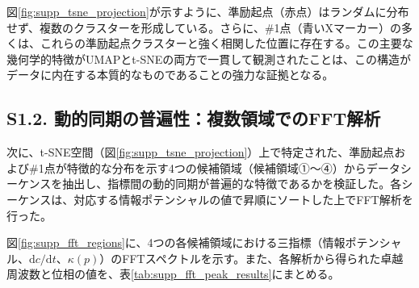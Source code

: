 \documentclass[a4paper,12pt]{article}
\begin{document}
図\ref{fig:supp_tsne_projection}が示すように、準励起点（赤点）はランダムに分布せず、複数のクラスターを形成している。さらに、\#1点（青いXマーカー）の多くは、これらの準励起点クラスターと強く相関した位置に存在する。この主要な幾何学的特徴がUMAPとt-SNEの両方で一貫して観測されたことは、この構造がデータに内在する本質的なものであることの強力な証拠となる。

\subsection*{S1.2. 動的同期の普遍性：複数領域でのFFT解析}
\label{subsec:supp_fft}

次に、t-SNE空間（図\ref{fig:supp_tsne_projection}）上で特定された、準励起点および\#1点が特徴的な分布を示す4つの候補領域（候補領域①～④）からデータシーケンスを抽出し、指標間の動的同期が普遍的な特徴であるかを検証した。各シーケンスは、対応する情報ポテンシャルの値で昇順にソートした上でFFT解析を行った。

図\ref{fig:supp_fft_regions}に、4つの各候補領域における三指標（情報ポテンシャル、$\mathrm{d}c/\mathrm{d}t$、$\kappa(p)$）のFFTスペクトルを示す。また、各解析から得られた卓越周波数と位相の値を、表\ref{tab:supp_fft_peak_results}にまとめる。
\end{document}
